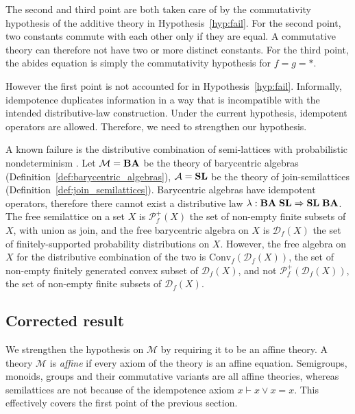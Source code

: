 The second and third point are both taken care of by the commutativity hypothesis of the additive theory in Hypothesis~\ref{hyp:fail}. For the second point, two constants commute with each other only if they are equal. A commutative theory can therefore not have two or more distinct constants. For the third point, the abides equation is simply the commutativity hypothesis for $f = g = \ast$.

However the first point is not accounted for in Hypothesis~\ref{hyp:fail}. Informally, idempotence duplicates information in a way that is incompatible with the intended distributive-law construction. Under the current hypothesis, idempotent operators are allowed. Therefore, we need to strengthen our hypothesis.

A known failure is the distributive combination of semi-lattices with probabilistic nondeterminism \parencite[][due to Gordon Plotkin]{varacca_example}. Let $\mathcal M = {\mathbf{BA}}$ be the theory of barycentric algebras (Definition~\ref{def:barycentric_algebras}), $\mathcal A = {\mathbf{SL}}$ be the theory of join-semilattices (Definition~\ref{def:join_semilattices}). Barycentric algebras have idempotent operators, therefore there cannot exist a distributive law $\lambda : {\mathbf{BA}}\;{\mathbf{SL}} \Rightarrow {\mathbf{SL}}\;{\mathbf{BA}}$. The free semilattice on a set $X$ is $\mathcal P_f^+(X)$ the set of non-empty finite subsets of $X$, with union as join, and the free barycentric algebra on $X$ is $\mathcal D_f(X)$ the set of finitely-supported probability distributions on $X$. However, the free algebra on $X$ for the distributive combination of the two is $\mathrm{Conv}_f(\mathcal{D}_f (X))$, the set of non-empty finitely generated convex subset of $\mathcal{D}_f(X)$, and not $\mathcal P_f^+ (\mathcal D_f (X))$, the set of non-empty finite subsets of $\mathcal D_f(X)$.

\subsection{Corrected result}
\label{sec:corrected_result}

We strengthen the hypothesis on $\mathcal{M}$ by requiring it to be an affine theory. A theory $\mathcal{M}$ is \emph{affine} if every axiom of the theory is an affine equation.
Semigroups, monoids, groups and their commutative variants are all affine theories, whereas semilattices are not because of the idempotence axiom $x \vdash x \vee x = x$. This effectively covers the first point of the previous section.

